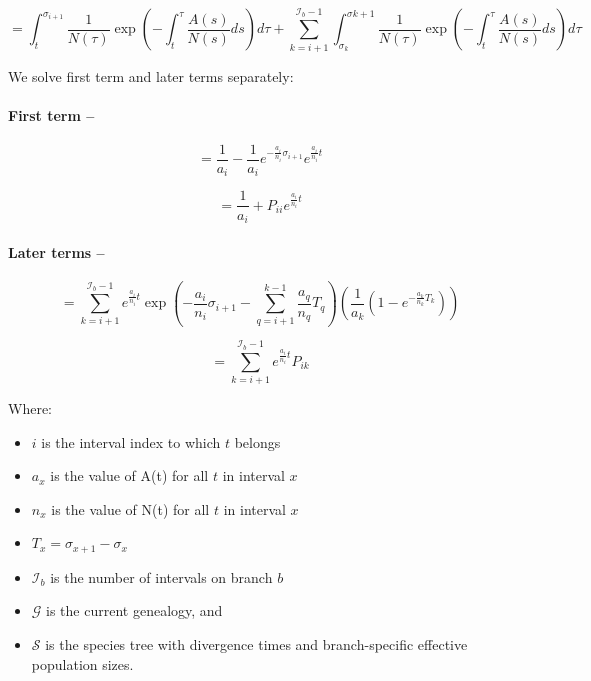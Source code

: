 \documentclass[11pt]{article}
\begin{document}
\begin{equation}
	= \int_{t}^{\sigma_{i+1}} \frac{1}{N(\tau)}\exp\left(-\int_{t}^{\tau}\frac{A(s)}{N(s)}ds\right)d\tau + \sum_{k=i+1}^{\mathcal{I}_b-1}\int_{\sigma_{k}}^{\sigma{k+1}}\frac{1}{N(\tau)}\exp\left(-\int_{t}^{\tau}\frac{A(s)}{N(s)}ds\right)d\tau
\end{equation}

We solve first term and later terms separately:

\paragraph{First term --}

\begin{equation}
	= \frac{1}{a_i} - \frac{1}{a_i}e^{-\frac{a_i}{n_i}\sigma_{i+1}}e^{\frac{a_i}{n_i}t}
\end{equation}

\begin{equation}
	= \frac{1}{a_i} +P_{ii}e^{\frac{a_i}{n_i}t}
\end{equation}

\paragraph{Later terms --}

\begin{equation}
	= \sum_{k=i+1}^{\mathcal{I}_b-1} e^{\frac{a_i}{n_i}t} \exp\left(-\frac{a_i}{n_i}\sigma_{i+1}-\sum_{q=i+1}^{k-1} \frac{a_q}{n_q}T_q\right)\left(\frac{1}{a_{k}}(1-e^{-\frac{a_{k}}{n_{k}}T_{k}})\right)
\end{equation}

\begin{equation}
	= \sum_{k=i+1}^{\mathcal{I}_b-1} e^{\frac{a_i}{n_i}t} P_{ik}
\end{equation}

Where:
\begin{itemize}
  \item $i$ is the interval index to which $t$ belongs
  \item $a_x$ is the value of A(t) for all $t$ in interval $x$
  \item $n_x$ is the value of N(t) for all $t$ in interval $x$
  \item $T_x = \sigma_{x+1} - \sigma_{x}$
  \item $\mathcal{I}_b$ is the number of intervals on branch $b$
  \item $\mathcal{G}$ is the current genealogy, and 
  \item $\mathcal{S}$ is the species tree with divergence times and branch-specific effective population sizes.
\end{itemize}
\end{document}
